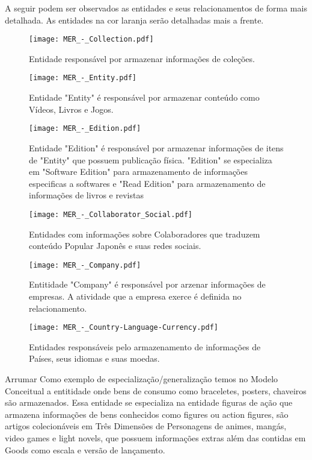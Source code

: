 \documentclass[12pt]{article}
\begin{document}
A seguir podem ser observados as entidades e seus relacionamentos de forma mais detalhada. As entidades na cor laranja serão detalhadas mais a frente.

\begin{figure}[H]
\centering
\texttt{[image: MER\_-\_Collection.pdf]}
\caption{Entidade responsável por armazenar informações de coleções.} \label{collection}
\end{figure}


\begin{figure}[H]
\centering
\texttt{[image: MER\_-\_Entity.pdf]}
\caption{Entidade "Entity" é responsável por armazenar conteúdo como Vídeos, Livros e Jogos.} \label{entity}
\end{figure}

\begin{figure}[H]
\centering
\texttt{[image: MER\_-\_Edition.pdf]}
\caption{Entidade "Edition" é responsável por armazenar informações de itens de "Entity" que possuem publicação física. "Edition" se especializa em "Software Edition" para armazenamento de informações especificas a softwares e "Read Edition" para armazenamento de informações de livros e revistas} \label{edition}
\end{figure}

\begin{figure}[H]
\centering
\texttt{[image: MER\_-\_Collaborator\_Social.pdf]}
\caption{Entidades com informações sobre Colaboradores que traduzem conteúdo Popular Japonês e suas redes sociais.} \label{collaborator}
\end{figure}

\begin{figure}[H]
\centering
\texttt{[image: MER\_-\_Company.pdf]}
\caption{Entitidade "Company" é responsável por arzenar informações de empresas. A atividade que a empresa exerce é definida no relacionamento.} \label{company}
\end{figure}

\begin{figure}[H]
\centering
\texttt{[image: MER\_-\_Country-Language-Currency.pdf]}
\caption{Entidades responsáveis pelo armazenamento de informações de Países, seus idiomas e suas moedas.} \label{hash}
\end{figure}

{Arrumar}
Como exemplo de especialização/generalização temos no Modelo Conceitual a entitidade onde bens de consumo como braceletes, posters, chaveiros são armazenados. Essa entidade se especializa na entidade figuras de ação que armazena informações de bens conhecidos como figures ou action figures, são artigos colecionáveis em Três Dimensões de Personagens de animes, mangás, video games e light novels,
 que possuem informações extras além das contidas em Goods como escala e versão de lançamento.
\end{document}
